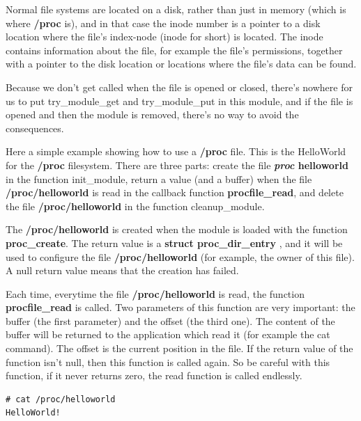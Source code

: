 \documentclass[11pt]{article}
\begin{document}
Normal file systems are located on a disk, rather than just in memory (which is where \textbf{/proc} is), and in that case the inode number is a pointer to a disk location where the file's index-node (inode for short) is located. The inode contains information about the file, for example the file's permissions, together with a pointer to the disk location or locations where the file's data can be found.

Because we don't get called when the file is opened or closed, there's nowhere for us to put try\_module\_get and try\_module\_put in this module, and if the file is opened and then the module is removed, there's no way to avoid the consequences.

Here a simple example showing how to use a \textbf{/proc} file. This is the HelloWorld for the \textbf{/proc} filesystem. There are three parts: create the file \textbf{\emph{proc} helloworld} in the function init\_module, return a value (and a buffer) when the file \textbf{/proc/helloworld} is read in the callback function \textbf{procfile\_read}, and delete the file \textbf{/proc/helloworld} in the function cleanup\_module.

The \textbf{/proc/helloworld} is created when the module is loaded with the function \textbf{proc\_create}. The return value is a \textbf{struct proc\_dir\_entry} , and it will be used to configure the file \textbf{/proc/helloworld} (for example, the owner of this file). A null return value means that the creation has failed.

Each time, everytime the file \textbf{/proc/helloworld} is read, the function \textbf{procfile\_read} is called. Two parameters of this function are very important: the buffer (the first parameter) and the offset (the third one). The content of the buffer will be returned to the application which read it (for example the cat command). The offset is the current position in the file. If the return value of the function isn't null, then this function is called again. So be careful with this function, if it never returns zero, the read function is called endlessly.

\begin{verbatim}
# cat /proc/helloworld
HelloWorld!
\end{verbatim}
\end{document}
